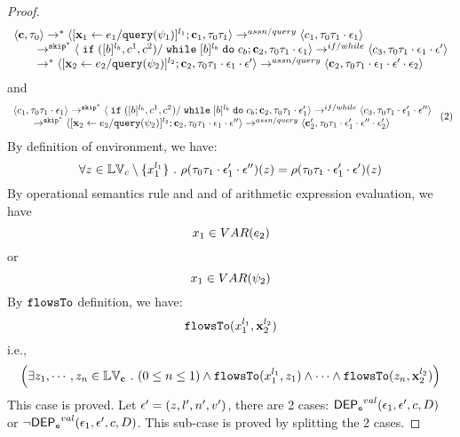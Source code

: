 \begin{proof}
\[\begin{array}{l}
\langle {\boldsymbol{\mathbf{c}}}, \mathtt{\tau}_0 \rangle \rightarrow^{*} 
\langle [\mathrel{ {\boldsymbol{\mathbf{x}}}_1 \leftarrow e_1 / {\tt query}(\psi_1) }]^{l_1} ; {\boldsymbol{\mathbf{c}}}_1, \mathtt{\tau}_0 \mathtt{\tau}_1 \rangle  
\rightarrow^{assn/query}
 \langle c_1, \mathtt{\tau}_0 \mathtt{\tau}_1 \cdot \mathtt{\epsilon}_1 \rangle 
 \\
  \qquad \rightarrow^{\mathtt{skip}^*} 
  \langle \;\mathtt{if}\; ([b]^{l_b}, c^1, c^2) / \;\mathtt{while}\; [b]^{l_b} \;\mathtt{do}\; c_b;{\boldsymbol{\mathbf{c}}}_2, 
  \mathtt{\tau}_0 \mathtt{\tau}_1 \cdot \mathtt{\epsilon}_1 \rangle 
 \rightarrow^{if / while} 
  \langle c_3, 
  \mathtt{\tau}_0 \mathtt{\tau}_1 \cdot \mathtt{\epsilon}_1 \cdot \mathtt{\epsilon}' \rangle 
  \\
  \qquad   \rightarrow^{*} 
  \langle [\mathrel{ {\boldsymbol{\mathbf{x}}}_2 \leftarrow e_2 / {\tt query}(\psi_2) }]^{l_2};{\boldsymbol{\mathbf{c}}}_2, 
  \mathtt{\tau}_0 \mathtt{\tau}_1 \cdot \mathtt{\epsilon}_1 \cdot \mathtt{\epsilon}' \rangle 
  \rightarrow^{assn/query} 
  \langle {\boldsymbol{\mathbf{c}}}_2,  \mathtt{\tau}_0 \mathtt{\tau}_1 \cdot \mathtt{\epsilon}_1 \cdot \mathtt{\epsilon}' \cdot \mathtt{\epsilon}_2 \rangle 
\end{array}
 \]
 and 
  \[
  \begin{array}{l}   
  \langle c_1, \mathtt{\tau}_0 \mathtt{\tau}_1 \cdot \mathtt{\epsilon}_1 \rangle 
  \rightarrow^{\mathtt{skip}^*} 
  \langle \;\mathtt{if}\; ([b]^{l_b}, c^1, c^2) / \;\mathtt{while}\; [b]^{l_b} \;\mathtt{do}\; c_b;{\boldsymbol{\mathbf{c}}}_2, 
  \mathtt{\tau}_0 \mathtt{\tau}_1 \cdot \mathtt{\epsilon}_1' \rangle 
  \rightarrow^{if / while} 
  \langle c_3, 
  \mathtt{\tau}_0 \mathtt{\tau}_1 \cdot \mathtt{\epsilon}_1' \cdot \mathtt{\epsilon}'' \rangle 
  \\
  \qquad \rightarrow^{\mathtt{skip}^*} 
  \langle [\mathrel{ {\boldsymbol{\mathbf{x}}}_2 \leftarrow e_2 / {\tt query}(\psi_2) }]^{l_2};{\boldsymbol{\mathbf{c}}}_2, 
  \mathtt{\tau}_0 \mathtt{\tau}_1 \cdot \mathtt{\epsilon}_1\cdot \mathtt{\epsilon}'' \rangle 
  \rightarrow^{assn/query} 
  \langle {\boldsymbol{\mathbf{c}}}_2',  \mathtt{\tau}_0 \mathtt{\tau}_1 \cdot \mathtt{\epsilon}_1' \cdot \mathtt{\epsilon}'' \cdot \mathtt{\epsilon}_2' \rangle 
\end{array} ~(2)
 \]
%
By definition of environment, we have:
\[
  \forall z \in \mathbb{LV}_c \setminus \{x_1^{l_1}\} ~.~
  \rho(\mathtt{\tau}_0 \mathtt{\tau}_1 \cdot \mathtt{\epsilon}_1' \cdot \mathtt{\epsilon}'') (z) =  
  \rho(\mathtt{\tau}_0 \mathtt{\tau}_1 \cdot \mathtt{\epsilon}_1' \cdot \mathtt{\epsilon}') (z)
\]
By operational semantics rule  and  and  of arithmetic expression evaluation, we have 
\[
  x_1 \in VAR(e_2) 
\]
or
\[
  x_1 \in VAR(\psi_2)
\]
%
By $\mathtt{flowsTo}$ definition, we have:
%
\[
\mathtt{flowsTo}(x_1^{l_1}, {\boldsymbol{\mathbf{x}}}_2^{l_2})
\]
i.e.,
%
\[
 \Big( \exists z_1, \cdots, z_n \in \mathbb{LV}_{{\boldsymbol{\mathbf{c}}}} ~.~ (0 \leq n \leq 1 )
 \land \mathtt{flowsTo}(x_1^{l_1}, z_1) \land \cdots \land \mathtt{flowsTo}(z_n, {\boldsymbol{\mathbf{x}}}_2^{l_2}) \Big)
\]
%
This case is proved.
%
%
Let $\mathtt{\epsilon}' = (z, l', n', v')$, there are 2 cases:
%
$\mathsf{DEP_{\mathtt{e}}}^{val}(\mathtt{\epsilon}_1, \mathtt{\epsilon}', c, D)$ or $\neg \mathsf{DEP_{\mathtt{e}}}^{val}(\mathtt{\epsilon}_1, \mathtt{\epsilon}', c, D)$.
%
This sub-case is proved by splitting the 2 cases.

\end{proof}
